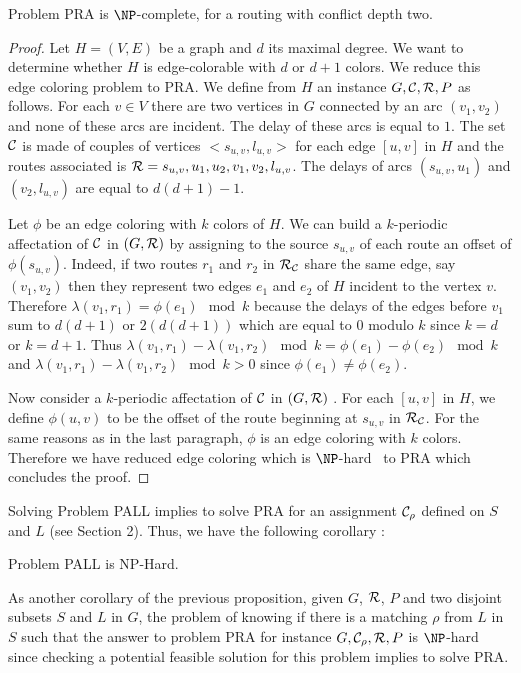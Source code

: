 \documentclass{article}
\begin{document}
 

 \begin{proposition}
Problem PRA is $\NP$-complete, for a routing with conflict depth two.
\end{proposition}
 \begin{proof}
  Let $H=(V,E)$ be a graph and $d$ its maximal degree. We want to determine whether $H$ is edge-colorable
  with $d$ or $d+1$ colors. We reduce this edge coloring problem to PRA. We define  from $H$ an instance $G,{\cal C}, {\cal R}, P$ as follows. For each 
  $v \in V$ there are two vertices in $G$  connected by an arc $(v_1,v_2)$ and none of these arcs are incident. The delay of these arcs is equal to $1$.
  The set $\cal C$ is made of couples of vertices $<s_{u,v}, l_{u,v}>$ for each edge $[u,v]$ in $H$ and the routes associated is ${\cal R} =s_{u,v},u_1,u_2,v_1,v_2,l_{u,v}$.  The delays of arcs $(s_{u,v},u_1)$ and $(v_2,l_{u,v})$ are equal to $d(d+1)-1$.  
    
  Let $\phi$ be an edge coloring with $k$ colors of $H$. We can build a $k$-periodic affectation of $\cal C$ in $(G,{\cal R})$
  by assigning to the source $s_{u,v}$ of each route an offset  of $\phi(s_{u,v})$. Indeed, 
  if two routes $r_1$ and $r_2$ in ${\cal R}_{\cal C}$ share the same edge, say $(v_1,v_2)$ then they represent two edges $e_1$ and $e_2$ of $H$ incident  
  to the vertex $v$. Therefore $\lambda(v_1,r_1) = \phi(e_1) \mod k$ because the delays of the edges before $v_1$ sum to $d(d+1)$ or 
  $2(d(d+1))$ which are equal to $0$ modulo $k$ since $k=d$ or $k=d+1$. Thus $\lambda(v_1,r_1) - \lambda(v_1,r_2) \mod k = \phi(e_1) - \phi(e_2) \mod k$
  and $\lambda(v_1,r_1) - \lambda(v_1,r_2) \mod k > 0$ since $\phi(e_1) \neq \phi(e_2) $.
  
  Now consider a $k$-periodic affectation of $\cal C$ in $(G,{\cal R})$ . For each $[u,v]$ in $H$, we define $\phi(u,v)$ to be the offset of the route
  beginning at $s_{u,v}$ in ${\cal R}_{\cal C}$. For the same reasons as in the last paragraph, $\phi$ is an edge coloring with $k$ colors.
  Therefore we have reduced edge coloring which is $\NP$-hard~\cite{holyer1981np} to PRA which concludes the proof. 
 \end{proof}
Solving Problem PALL implies to solve PRA for an assignment ${\cal C}_{\rho}$ defined on $S$ and $L$ (see Section 2). Thus, we have the following corollary :

\begin{corollary}
Problem PALL is NP-Hard.
\end{corollary}

As another corollary of the previous proposition,  given $G$, $\cal R$, $P$ and two disjoint subsets $S$ and $L$ in $G$, the problem of  knowing if there is a matching $\rho$  from $L$ in $S$ such that the answer to problem PRA for instance $G,{\cal C_{\rho}},{\cal R}, P$ is  $\NP$-hard since checking a potential feasible solution for this problem implies to solve PRA.\\
\end{document}

